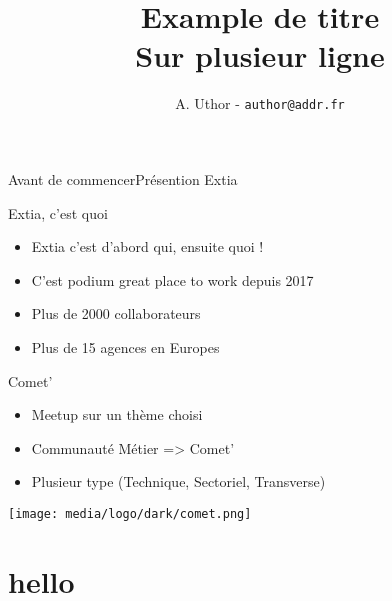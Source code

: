 \documentclass[aspectratio=169, xetex, 12pt]{beamer}
\title{Example de titre \\Sur plusieur ligne}
\author{A. Uthor - \texttt{author@addr.fr}}
\institute{Extia}
\date{\displaydate{date}}
\begin{document}
{
    \begin{frame}
        \titlepage
    \end{frame}
}

\begin{frame}{Avant de commencer}{Présention Extia}
    \begin{block}{Extia, c'est quoi}
        \begin{minipage}{0.7\paperwidth}
            \begin{itemize}
                \item Extia c'est d'abord qui, ensuite quoi !
                \item C'est podium great place to work depuis 2017
                \item Plus de 2000 collaborateurs
                \item Plus de 15 agences en Europes
            \end{itemize}
        \end{minipage}
    \end{block}
    \begin{block}{Comet'}
        \begin{minipage}{0.7\paperwidth}
            \begin{itemize}
                \item Meetup sur un thème choisi
                \item Communauté Métier => Comet'
                \item Plusieur type (Technique, Sectoriel, Transverse)
            \end{itemize}
        \end{minipage}
        \begin{minipage}{0.2\paperwidth}
            \begin{center}
                \texttt{[image: media/logo/dark/comet.png]}
            \end{center}
        \end{minipage}
    \end{block}
\end{frame}

\section{hello}
\end{document}
